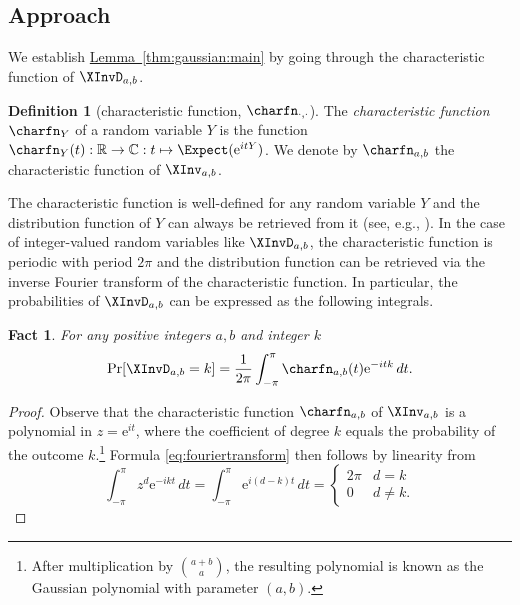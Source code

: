 \documentclass[11pt]{article}
\numberwithin{equation}{section}
\newtheorem{fact}[theorem]{Fact}
\theoremstyle{definition}
\newtheorem{definition}[theorem]{Definition}
\theoremstyle{plain}
\newcommand{\eee}{\mathrm e}
\newcommand{\expref}[2]{\hyperref[#2]{#1~\ref{#2}}}
\begin{document}
\subsection{Approach}

We establish \expref{Lemma}{thm:gaussian:main} by going through the characteristic function of $\XInvD_{a,b}$. 
\begin{definition}[characteristic function, $\charfn_{\cdot,\cdot}$]
The \emph{characteristic function} $\charfn_Y$ of a random variable $Y$ is the function $\charfn_Y(t):\mathbb{R}\to\mathbb{C}: t \mapsto \Expect(\eee^{itY})$. We denote by $\charfn_{a,b}$ the characteristic function of $\XInv_{a,b}$.
\end{definition}
The characteristic function is well-defined for any random variable $Y$ and the distribution function of $Y$ can always be retrieved from it (see, e.g., \cite[Chapter VI]{Renyi}). In the case of integer-valued random variables like $\XInvD_{a,b}$, the characteristic function is periodic with period $2\pi$ and the distribution function can be retrieved via the inverse Fourier transform of the characteristic function. In particular, the probabilities of $\XInvD_{a,b}$ can be expressed as the following integrals.
\begin{fact}
For any positive integers $a,b$ and integer $k$
\begin{equation}
    \label{eq:fouriertransform}
    \Pr[\XInvD_{a,b}=k] = \frac{1}{2\pi} \int_{-\pi}^{\pi}\charfn_{a,b}(t)\eee^{-itk}\,dt.
\end{equation}
\end{fact}
\begin{proof}
Observe that the characteristic function $\charfn_{a,b}$ of $\XInv_{a,b}$ is a polynomial in $z=\eee^{it}$, where the coefficient of degree $k$ equals the probability of the outcome $k$.\footnote{After multiplication by $\binom{a+b}{a}$, the resulting polynomial is known as the Gaussian polynomial with parameter $(a,b)$.} 
Formula \eqref{eq:fouriertransform} then follows by linearity from
\[
\int_{-\pi}^\pi z^d \eee^{-ikt} \, dt = 
\int_{-\pi}^\pi \eee^{i(d-k)t} \, dt =
\left\{ \begin{array}{cl} 2\pi & d=k \\
                             0 & d \ne k.
\end{array} \right.
\]
\end{proof}
\end{document}

